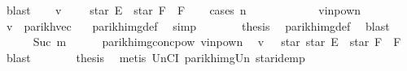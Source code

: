 \begin{isabellebody}
\ blast\isanewline
\ \ \isamarkupfalse%
\ {\isachardoublequoteopen}v\ {\isasymin}\ {\isasymPsi}\ {\isacharparenleft}{\kern0pt}{\isacharbraceleft}{\kern0pt}{\isacharbrackleft}{\kern0pt}{\isacharbrackright}{\kern0pt}{\isacharbraceright}{\kern0pt}\ {\isasymunion}\ star\ E\ {\isacharat}{\kern0pt}{\isacharat}{\kern0pt}\ star\ F\ {\isacharat}{\kern0pt}{\isacharat}{\kern0pt}\ F{\isacharparenright}{\kern0pt}{\isachardoublequoteclose}\isanewline
\ \ \isamarkupfalse%
\ {\isacharparenleft}{\kern0pt}cases\ n{\isacharparenright}{\kern0pt}\isanewline
\ \ \ \ \isamarkupfalse%
\ {}\isanewline
\ \ \ \ \isamarkupfalse%
\ v{\isacharunderscore}{\kern0pt}in{\isacharunderscore}{\kern0pt}pow{\isacharunderscore}{\kern0pt}n\ \isamarkupfalse%
\ {\isachardoublequoteopen}v\ {\isacharequal}{\kern0pt}\ parikh{\isacharunderscore}{\kern0pt}vec\ {\isacharbrackleft}{\kern0pt}{\isacharbrackright}{\kern0pt}{\isachardoublequoteclose}\ \isamarkupfalse%
\ parikh{\isacharunderscore}{\kern0pt}img{\isacharunderscore}{\kern0pt}def\ \isamarkupfalse%
\ simp\isanewline
\ \ \ \ \isamarkupfalse%
\ \isamarkupfalse%
\ {\isacharquery}{\kern0pt}thesis\ \isamarkupfalse%
\ parikh{\isacharunderscore}{\kern0pt}img{\isacharunderscore}{\kern0pt}def\ \isamarkupfalse%
\ blast\isanewline
\ \ \isamarkupfalse%
\isanewline
\ \ \ \ \isamarkupfalse%
\ {\isacharparenleft}{\kern0pt}Suc\ m{\isacharparenright}{\kern0pt}\isanewline
\ \ \ \ \isamarkupfalse%
\ parikh{\isacharunderscore}{\kern0pt}img{\isacharunderscore}{\kern0pt}conc{\isacharunderscore}{\kern0pt}pow{}\ v{\isacharunderscore}{\kern0pt}in{\isacharunderscore}{\kern0pt}pow{\isacharunderscore}{\kern0pt}n\ \isamarkupfalse%
\ {\isachardoublequoteopen}v\ {\isasymin}\ {\isasymPsi}\ {\isacharparenleft}{\kern0pt}star\ {\isacharparenleft}{\kern0pt}star\ E{\isacharparenright}{\kern0pt}\ {\isacharat}{\kern0pt}{\isacharat}{\kern0pt}\ star\ F\ {\isacharat}{\kern0pt}{\isacharat}{\kern0pt}\ F{\isacharparenright}{\kern0pt}{\isachardoublequoteclose}\ \isamarkupfalse%
\ blast\isanewline
\ \ \ \ \isamarkupfalse%
\ \isamarkupfalse%
\ {\isacharquery}{\kern0pt}thesis\ \isamarkupfalse%
\ {\isacharparenleft}{\kern0pt}metis\ UnCI\ parikh{\isacharunderscore}{\kern0pt}img{\isacharunderscore}{\kern0pt}Un\ star{\isacharunderscore}{\kern0pt}idemp{\isacharparenright}{\kern0pt}\isanewline

\end{isabellebody}
